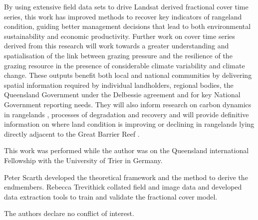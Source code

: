\documentclass[remotesensing,article,accept,moreauthors,pdftex,12pt,a4paper]{mdpi}
\begin{document}
By using extensive field data sets to drive Landsat derived fractional cover time series, this work has improved methods to recover key indicators of rangeland condition, guiding better management decisions that lead to both environmental sustainability and economic productivity. Further work on cover time series derived from this research will work towards a greater understanding and spatialisation of the link between grazing pressure and the resilience of the grazing resource in the presence of considerable climate variability and climate change. These outputs benefit both local and national communities by delivering spatial information required by individual landholders, regional bodies, the Queensland Government under the Delbessie agreement and for key National Government reporting needs. They will also inform research on carbon dynamics in rangelands , processes of degradation and recovery and will provide definitive information on where land condition is improving or declining in rangelands lying directly adjacent to the Great Barrier Reef . 


This work was performed while the author was on the Queensland international Fellowship with the University of Trier in Germany. 



Peter Scarth developed the theoretical framework and the method to derive the endmembers. Rebecca Trevithick collated field and image data and developed data extraction tools to train and validate the fractional cover model.



The authors declare no conflict of interest. 

%

\end{document}
